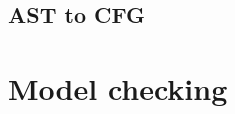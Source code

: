 \documentclass{report}
\begin{document}
\paragraph{}
\hspace{4mm}\textnormal{}

\section{AST to CFG}

\chapter{Model checking}
\end{document}
